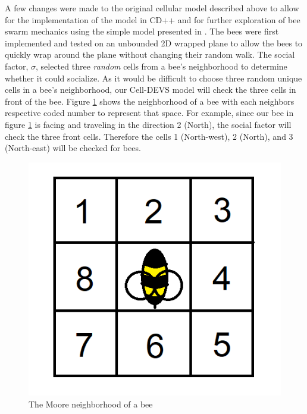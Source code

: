 \documentclass[conference,compsoc,onecolumn]{IEEEtran}
\begin{document}
A few changes were made to the original cellular model described above to allow for the implementation of the model in CD++ and for further exploration of bee swarm mechanics using the simple model presented in \cite{Stefanc2017, Szopek2017}. The bees were first implemented and tested on an unbounded 2D wrapped plane to allow the bees to quickly wrap around the plane without changing their random walk. The social factor, $\sigma$, selected three \emph{random} cells from a bee's neighborhood to determine whether it could socialize. As it would be difficult to choose three random unique cells in a bee's neighborhood, our Cell-DEVS model will check the three cells in front of the bee. Figure \ref{neighborhood} shows the neighborhood of a bee with each neighbors respective coded number to represent that space. For example, since our bee in figure \ref{neighborhood} is facing and traveling in the direction 2 (North), the social factor will check the three front cells. Therefore the cells 1 (North-west), 2 (North), and 3 (North-east) will be checked for bees.

\begin{figure}[htbp]
	\centerline{\includegraphics[scale=0.35]{../images/moore-neighbourhood.png}}
	\caption{The Moore neighborhood of a bee}
	\label{neighborhood}
\end{figure}
\end{document}
